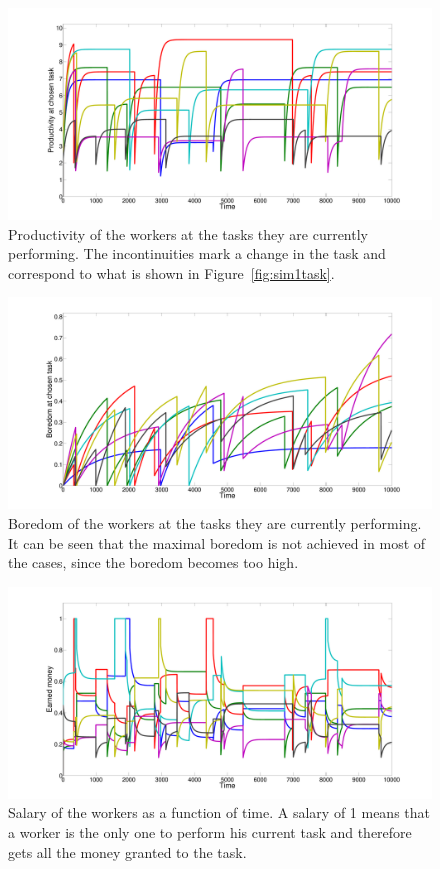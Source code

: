 \begin{figure}[h!]
	\centering
	\includegraphics[width=\textwidth]{../figures/productivity.pdf}
	\caption{Productivity of the workers at the tasks they are currently performing. The incontinuities mark a change in the task and correspond to what is shown in Figure~\ref{fig:sim1task}.}
	\label{fig:sim1prod}
\end{figure}

\begin{figure}[h!]
	\centering
	\includegraphics[width=\textwidth]{../figures/boredom.pdf}
	\caption{Boredom of the workers at the tasks they are currently performing. It can be seen that the maximal boredom is not achieved in most of the cases, since the boredom becomes too high.}
	\label{fig:sim1boredom}
\end{figure}

\begin{figure}[h!]
	\centering
	\includegraphics[width=\textwidth]{../figures/money.pdf}
	\caption{Salary of the workers as a function of time. A salary of 1 means that a worker is the only one to perform his current task and therefore gets all the money granted to the task.}
	\label{fig:sim1money}
\end{figure}

